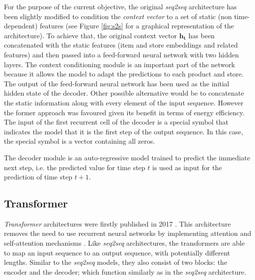 For the purpose of the current objective, the original \textit{seq2seq} architecture has been slightly modified to condition the \textit{context vector} to a set of static (non time-dependent) features (see Figure \ref{fig:s2s} for a graphical representation of the architecture). To achieve that, the original context vector $\mathbf{h_t}$ has been concatenated with the static features (item and store embeddings and related features) and then passed into a feed-forward neural network with two hidden layers. The context conditioning module is an important part of the network because it allows the model to adapt the predictions to each product and store. The output of the feed-forward neural network has been used as the initial hidden state of the decoder. Other possible alternative would be to concatenate the static information along with every element of the input sequence. However the former approach was favoured given its benefit in terms of energy efficiency. The input of the first recurrent cell of the decoder is a special symbol that indicates the model that it is the first step of the output sequence. In this case, the special symbol is a vector containing all zeros.

The decoder module is an auto-regressive model trained to predict the immediate next step, i.e. the predicted value for time step $t$ is used as input for the prediction of time step $t+1$.



\subsection{Transformer}
\textit{Transformer} architectures were firstly published  in 2017 \autocite{vaswani2017}. This architecture removes the need to use recurrent neural networks by implementing attention and self-attention mechanisms \autocite{bahdanau2015}.  Like \textit{seq2seq} architectures, the transformers are able to map an input sequence to an output sequence, with potentially different lengths. Similar to the \textit{seq2seq} models, they also consist of two blocks: the encoder and the decoder; which function similarly as in the \textit{seq2seq} architecture.

